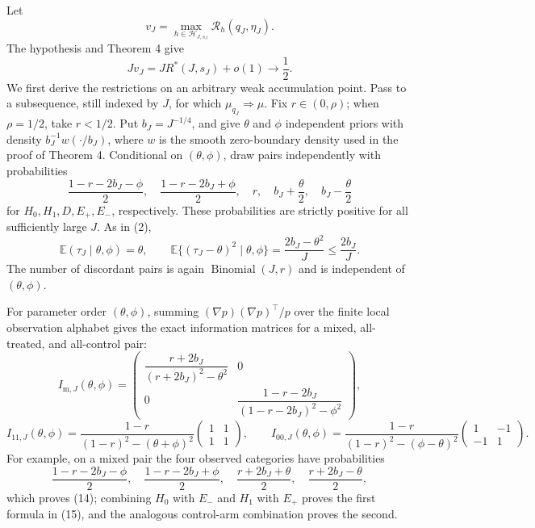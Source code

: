 Let
\[
 v_J=\max_{h\in\mathcal H_{J,s_J}}\mathcal R_h(q_J,\eta_J).
\]
The hypothesis and Theorem 4 give
\[
 Jv_J=J R^*(J,s_J)+o(1)\longrightarrow\frac12.
 \tag{11}
\]
We first derive the restrictions on an arbitrary weak accumulation point.  Pass to a subsequence, still indexed by \(J\), for which \(\mu_{q_J}\Rightarrow\mu\).  Fix \(r\in(0,\rho)\); when \(\rho=1/2\), take \(r<1/2\).  Put \(b_J=J^{-1/4}\), and give \(\theta\) and \(\phi\) independent priors with density \(b_J^{-1}w(\cdot/b_J)\), where \(w\) is the smooth zero-boundary density used in the proof of Theorem 4.  Conditional on \((\theta,\phi)\), draw pairs independently with probabilities
\[
 \frac{1-r-2b_J-\phi}{2},\quad
 \frac{1-r-2b_J+\phi}{2},\quad
 r,\quad
 b_J+\frac\theta2,\quad
 b_J-\frac\theta2
 \tag{12}
\]
for \(H_0,H_1,D,E_+,E_-\), respectively.  These probabilities are strictly positive for all sufficiently large \(J\).  As in (2),
\[
 \mathbb E(\tau_J\mid\theta,\phi)=\theta,
 \qquad
 \mathbb E\{(\tau_J-\theta)^2\mid\theta,\phi\}
 =\frac{2b_J-\theta^2}{J}\le\frac{2b_J}{J}.
 \tag{13}
\]
The number of discordant pairs is again \(\operatorname{Binomial}(J,r)\) and is independent of \((\theta,\phi)\).

For parameter order \((\theta,\phi)\), summing \((\nabla p)(\nabla p)^{\!\top}/p\) over the finite local observation alphabet gives the exact information matrices for a mixed, all-treated, and all-control pair:
\[
 I_{\mathrm m,J}(\theta,\phi)=
 \begin{pmatrix}
 \dfrac{r+2b_J}{(r+2b_J)^2-\theta^2}&0\\[5pt]
 0&\dfrac{1-r-2b_J}{(1-r-2b_J)^2-\phi^2}
 \end{pmatrix},
 \tag{14}
\]
\[
 I_{11,J}(\theta,\phi)=
 \frac{1-r}{(1-r)^2-(\theta+\phi)^2}
 \begin{pmatrix}1&1\\1&1\end{pmatrix},
 \qquad
 I_{00,J}(\theta,\phi)=
 \frac{1-r}{(1-r)^2-(\phi-\theta)^2}
 \begin{pmatrix}1&-1\\-1&1\end{pmatrix}.
 \tag{15}
\]
For example, on a mixed pair the four observed categories have probabilities
\[
 \frac{1-r-2b_J-\phi}{2},\quad
 \frac{1-r-2b_J+\phi}{2},\quad
 \frac{r+2b_J+\theta}{2},\quad
 \frac{r+2b_J-\theta}{2},
\]
which proves (14); combining \(H_0\) with \(E_-\) and \(H_1\) with \(E_+\) proves the first formula in (15), and the analogous control-arm combination proves the second.


